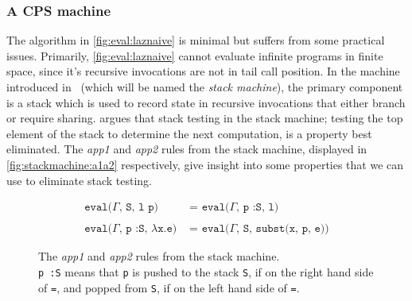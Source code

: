 \subsubsection{A CPS machine}
The algorithm in \autoref{fig:eval:laznaive} is minimal but suffers from some practical issues.
Primarily, \autoref{fig:eval:laznaive} cannot evaluate infinite programs in finite space, since it's recursive invocations are not in tail call position.
In the machine introduced in~\cite{sestoft1997deriving} (which will be named the \textit{stack machine}), the primary component is a stack which is used to record state in recursive invocations that either branch or require sharing.
\cite{sestoft1997deriving} argues that stack testing in the stack machine; testing the top element of the stack to determine the next computation, is a property best eliminated.
The \textit{app1} and \textit{app2} rules from the stack machine, displayed in \autoref{fig:stackmachine:a1a2} respectively, give insight into some properties that we can use to eliminate stack testing.
\begin{figure}[p]
\begin{mdframed}
\begin{align}
  \texttt{eval($\Gamma$, S, l p) }&\texttt{= eval($\Gamma$, p :S, l)}\tag*{}\\\tag*{}\\
  \texttt{eval($\Gamma$, p :S, $\lambda$x.e) }&\texttt{= eval($\Gamma$, S, subst(x, p, e))}\tag*{}
\end{align}
\end{mdframed}
  \caption{The \textit{app1} and \textit{app2} rules from the stack machine.\\
  \texttt{p :S} means that \texttt{p} is pushed to the stack \texttt{S}, if on the right hand side of \texttt{=}, and popped from \texttt{S}, if on the left hand side of \texttt{=}.}
  \label{fig:stackmachine:a1a2}
\end{figure}


